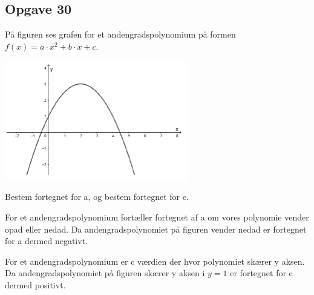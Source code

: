 \subsection{Opgave 30}

På figuren ses grafen for et andengradspolynomium på formen $f(x) = a\cdot x^2 +b\cdot x + c$.

\includegraphics[width=8cm]{Opgave_21-30/Opgave_30/30.png}

Bestem fortegnet for a, og bestem fortegnet for c.

\ans

For et andengradspolynomium fortæller fortegnet af a om vores polynomie vender opad eller nedad.
Da andengradspolynomiet på figuren vender nedad er fortegnet for a dermed negativt.

For et andengradspolynomium er c værdien der hvor polynomiet skærer y aksen.
Da andengradspolynomiet på figuren skærer y aksen i $y = 1$ er fortegnet for c dermed positivt.


